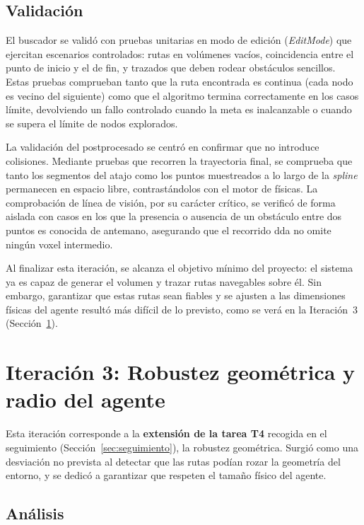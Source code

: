 \subsection{Validación}

El buscador se validó con pruebas unitarias en modo de edición (\textit{EditMode}) que ejercitan escenarios controlados: rutas en volúmenes vacíos, coincidencia entre el punto de inicio y el de fin, y trazados que deben rodear obstáculos sencillos.
Estas pruebas comprueban tanto que la ruta encontrada es continua (cada nodo es vecino del siguiente) como que el algoritmo termina correctamente en los casos límite, devolviendo un fallo controlado cuando la meta es inalcanzable o cuando se supera el límite de nodos explorados.

La validación del postprocesado se centró en confirmar que no introduce colisiones.
Mediante pruebas que recorren la trayectoria final, se comprueba que tanto los segmentos del atajo como los puntos muestreados a lo largo de la \textit{spline} permanecen en espacio libre, contrastándolos con el motor de físicas.
La comprobación de línea de visión, por su carácter crítico, se verificó de forma aislada con casos en los que la presencia o ausencia de un obstáculo entre dos puntos es conocida de antemano, asegurando que el recorrido \acrshort{dda} no omite ningún \gls{voxel} intermedio.

Al finalizar esta iteración, se alcanza el objetivo mínimo del proyecto: el sistema ya es capaz de generar el volumen y trazar rutas navegables sobre él.
Sin embargo, garantizar que estas rutas sean fiables y se ajusten a las dimensiones físicas del agente resultó más difícil de lo previsto, como se verá en la Iteración~3 (Sección~\ref{sec:iter-robustez}).

\section{Iteración 3: Robustez geométrica y radio del agente}
\label{sec:iter-robustez}

Esta iteración corresponde a la \textbf{extensión de la tarea T4} recogida en el seguimiento (Sección~\ref{sec:seguimiento}), la robustez geométrica.
Surgió como una desviación no prevista al detectar que las rutas podían rozar la geometría del entorno, y se dedicó a garantizar que respeten el tamaño físico del agente.

\subsection{Análisis}

